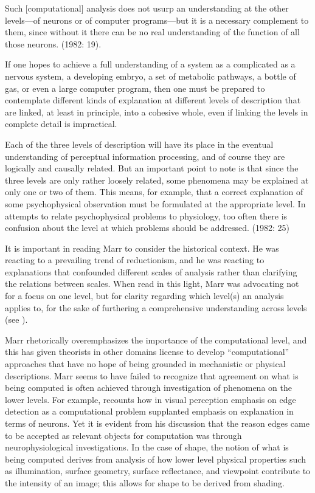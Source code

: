 Such [computational] analysis does not usurp an understanding at the other levels—of neurons or of computer programs—but it is a necessary complement to them, since without it there can be no real understanding of the function of all those neurons. (1982: 19).

If one hopes to achieve a full understanding of a system as a complicated as a nervous system, a developing embryo, a set of metabolic pathways, a bottle of gas, or even a large computer program, then one must be prepared to contemplate different kinds of explanation at different levels of description that are linked, at least in principle, into a cohesive whole, even if linking the levels in complete detail is impractical.

Each of the three levels of description will have its place in the eventual understanding of perceptual information processing, and of course they are logically and causally related. But an important point to note is that since the three levels are only rather loosely related, some phenomena may be explained at only one or two of them. This means, for example, that a correct explanation of some psychophysical observation must be formulated at the appropriate level. In attempts to relate psychophysical problems to physiology, too often there is confusion about the level at which problems should be addressed. (1982: 25)

It is important in reading Marr to consider the historical context. He was reacting to a prevailing trend of reductionism, and he was reacting to explanations that confounded different scales of analysis rather than clarifying the relations between scales. When read in this light, Marr was advocating not for a focus on one level, but for clarity regarding which level(s) an analysis applies to, for the sake of furthering a comprehensive understanding across levels (see \citealt{EliasmithKolbeck2015}). 

  Marr rhetorically overemphasizes the importance of the computational level, and this has given theorists in other domains license to develop “computational” approaches that have no hope of being grounded in mechanistic or physical descriptions. Marr seems to have failed to recognize that agreement on what is being computed is often achieved through investigation of phenomena on the lower levels. For example, \citet{Marr1982} recounts how in visual perception emphasis on edge detection as a computational problem supplanted emphasis on explanation in terms of neurons. Yet it is evident from his discussion that the reason edges came to be accepted as relevant objects for computation was through neurophysiological investigations. In the case of shape, the notion of what is being computed derives from analysis of how lower level physical properties such as illumination, surface geometry, surface reflectance, and viewpoint contribute to the intensity of an image; this allows for shape to be derived from shading. 

